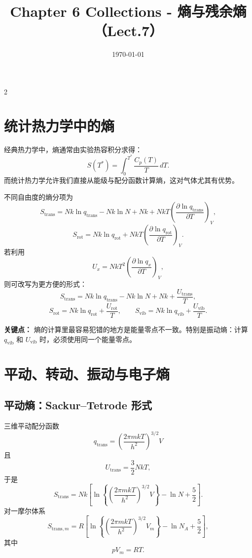 \documentclass[a4paper,9pt]{article}
\title{\vspace{-2em}\Large\bfseries\color{sectioncolor} Chapter 6 Collections - 熵与残余熵（Lect.7）\vspace{-1em}}
\author{}
\date{\today}
\newenvironment{keypoint}
{\par\vspace{0.3em}\noindent\begin{tcolorbox}[colback=keybg,colframe=keycolor,boxrule=0.5pt,arc=2pt,left=2pt,right=2pt,top=2pt,bottom=2pt,boxsep=0pt]\noindent\textcolor{keycolor}{\textbf{关键点：}}}
{\end{tcolorbox}\par\vspace{0.3em}}
\begin{document}
\maketitle
\thispagestyle{fancy}
\begin{multicols}{2}
	\scriptsize{\tableofcontents}

	\section{统计热力学中的熵}

	经典热力学中，熵通常由实验热容积分求得：
	\[
		S(T^*)=\int_0^{T^*}\frac{C_p(T)}{T}\,dT.
	\]
	而统计热力学允许我们直接从能级与配分函数计算熵，这对气体尤其有优势。

	不同自由度的熵分项为
	\[
		S_{\mathrm{trans}}=Nk\ln q_{\mathrm{trans}}-Nk\ln N+Nk+NkT\left(\frac{\partial\ln q_{\mathrm{trans}}}{\partial T}\right)_V,
	\]
	\[
		S_{\mathrm{rot}}=Nk\ln q_{\mathrm{rot}}+NkT\left(\frac{\partial\ln q_{\mathrm{rot}}}{\partial T}\right)_V.
	\]
	若利用
	\[
		U_x=NkT^2\left(\frac{\partial\ln q_x}{\partial T}\right)_V,
	\]
	则可改写为更方便的形式：
	\[
		S_{\mathrm{trans}}=Nk\ln q_{\mathrm{trans}}-Nk\ln N+Nk+\frac{U_{\mathrm{trans}}}{T},
	\]
	\[
		S_{\mathrm{rot}}=Nk\ln q_{\mathrm{rot}}+\frac{U_{\mathrm{rot}}}{T},
		\qquad
		S_{\mathrm{vib}}=Nk\ln q_{\mathrm{vib}}+\frac{U_{\mathrm{vib}}}{T}.
	\]

	\begin{keypoint}
		熵的计算里最容易犯错的地方是能量零点不一致。特别是振动熵：计算 $q_{\mathrm{vib}}$ 和 $U_{\mathrm{vib}}$ 时，必须使用同一个能量零点。
	\end{keypoint}

	\section{平动、转动、振动与电子熵}

	\subsection{平动熵：Sackur--Tetrode 形式}
	三维平动配分函数
	\[
		q_{\mathrm{trans}}=\left(\frac{2\pi mkT}{h^2}\right)^{3/2}V
	\]
	且
	\[
		U_{\mathrm{trans}}=\frac32NkT,
	\]
	于是
	\[
		S_{\mathrm{trans}}=Nk\left[\ln\left\{\left(\frac{2\pi mkT}{h^2}\right)^{3/2}V\right\}-\ln N+\frac52\right].
	\]
	对一摩尔体系
	\[
		S_{\mathrm{trans},m}=R\left[\ln\left\{\left(\frac{2\pi mkT}{h^2}\right)^{3/2}V_m\right\}-\ln N_A+\frac52\right],
	\]
	其中
	\[
		pV_m=RT.
	\]


\end{multicols}
\end{document}
